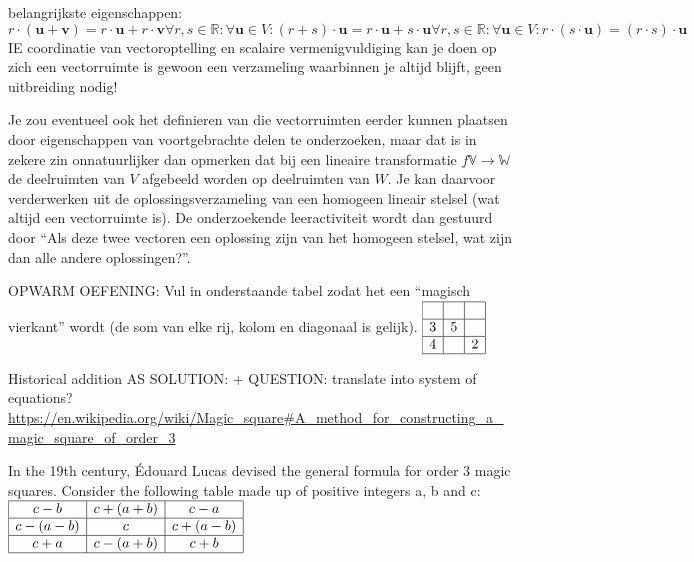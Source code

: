 \documentclass{ximera}
\begin{document}
\author{Alexander Holvoet}

belangrijkste eigenschappen:
$$
r\cdot (\mathbf{u}+\mathbf{v})=r\cdot \mathbf{u}+r\cdot \mathbf{v}
\forall r,s\in \mathbb{R}:\forall \mathbf{u} \in V:(r+s)\cdot \mathbf{u}=r\cdot \mathbf{u}+s \cdot \mathbf{u}
\forall r,s\in \mathbb{R}:\forall \mathbf{u} \in V:r\cdot (s\cdot \mathbf{u})=(r\cdot s) \cdot \mathbf{u}
$$
IE coordinatie van vectoroptelling en scalaire vermenigvuldiging
kan je doen op zich
een vectorruimte is gewoon een verzameling waarbinnen je altijd blijft, geen uitbreiding nodig!




Je zou eventueel ook het definieren van die vectorruimten eerder kunnen plaatsen door eigenschappen van voortgebrachte delen te onderzoeken, maar dat is in zekere zin onnatuurlijker dan opmerken dat bij een lineaire transformatie \(f \mathbb{V} \to \mathbb{W}\) de deelruimten van \(V\) afgebeeld worden op deelruimten van \(W\).
Je kan daarvoor verderwerken uit de oplossingsverzameling van een homogeen lineair stelsel (wat altijd een vectorruimte is).
De onderzoekende leeractiviteit wordt dan gestuurd door ``Als deze twee vectoren een oplossing zijn van het homogeen stelsel, wat zijn dan alle andere oplossingen?''.

OPWARM OEFENING:
Vul in onderstaande tabel zodat het een ``magisch vierkant'' wordt (de som van elke rij, kolom en diagonaal is gelijk).
\(
\begin{array}{|c|c|c|}
\hline
 &  &  \\
\hline
3 & 5 &  \\
\hline
4 &  & 2 \\
\hline
\end{array}
\)

Historical addition AS SOLUTION: + QUESTION: translate into system of equations?
\url{https://en.wikipedia.org/wiki/Magic_square#A_method_for_constructing_a_magic_square_of_order_3}

In the 19th century, Édouard Lucas devised the general formula for order 3 magic squares. Consider the following table made up of positive integers a, b and c:
\(
\begin{array}{|c|c|c|}
\hline
c - b & c + (a + b) & c - a \\
\hline
c - (a - b) & c & c + (a - b) \\
\hline
c + a & c - (a + b) & c + b \\
\hline
\end{array}
\)
\end{document}
